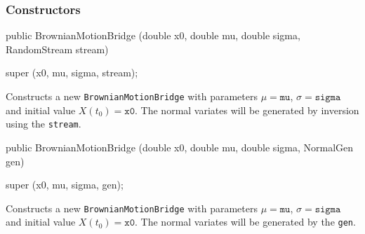 \subsubsection* {Constructors}
\begin{code}

   public BrownianMotionBridge (double x0, double mu, double sigma,
                                RandomStream stream) \begin{hide} {
        super (x0, mu, sigma, stream);
    }\end{hide}
\end{code}
\begin{tabb} Constructs a new \texttt{BrownianMotionBridge} with
parameters $\mu = \texttt{mu}$, $\sigma = \texttt{sigma}$ and initial value
$X(t_{0}) = \texttt{x0}$.
The normal variates will be
generated by inversion using the
 \texttt{stream}.
\end{tabb}
\begin{code}

   public BrownianMotionBridge (double x0, double mu, double sigma,
                                NormalGen gen) \begin{hide} {
        super (x0, mu, sigma, gen);
    }\end{hide}
\end{code}
\begin{tabb} Constructs a new \texttt{BrownianMotionBridge} with
parameters $\mu = \texttt{mu}$, $\sigma = \texttt{sigma}$ and initial value
$X(t_{0}) = \texttt{x0}$.
The normal variates will be
generated by the
 \texttt{gen}.
\end{tabb}
